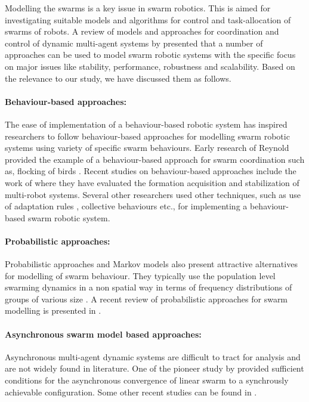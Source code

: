 Modelling the swarms is a key issue in swarm robotics. This is aimed for investigating suitable models and algorithms for control and task-allocation of swarms of robots. A review of models and approaches for coordination and control of dynamic multi-agent systems by \cite{Gazi+2006} presented that a number of approaches can be used to model swarm robotic systems with the specific focus on major issues like stability, performance, robustness and scalability. Based on the relevance to our study, we have discussed them as follows.
\paragraph*{Behaviour-based approaches:}
The ease of implementation of a behaviour-based robotic system has inspired researchers to follow behaviour-based approaches for modelling swarm robotic systems using variety of specific swarm behaviours. Early research of Reynold provided the example of a behaviour-based approach for swarm coordination such as, flocking of birds \cite{Reynolds1987}. Recent studies on behaviour-based approaches include the work of \cite{Balch+1998} where they have evaluated the formation acquisition and stabilization of multi-robot systems. Several other researchers used other techniques, such as use of adaptation rules \cite{Liu+2007}, collective behaviours \cite{Cianci2007} etc., for implementing a behaviour-based swarm robotic system.
\paragraph*{Probabilistic approaches:}
Probabilistic approaches and Markov models also present attractive alternatives for modelling of swarm behaviour. They typically use the population level swarming dynamics in a non spatial way in terms of frequency distributions of groups of various size \cite{Gazi+2006}. A recent review of probabilistic approaches for swarm modelling is presented in \cite{Lerman+2005}.
\paragraph*{Asynchronous swarm model based approaches:}
Asynchronous multi-agent dynamic systems are difficult to tract for analysis and are not widely found in literature. One of the pioneer study by \cite{Beni+1996} provided sufficient conditions for the asynchronous convergence of linear swarm to a synchrously achievable configuration. Some other recent studies can be found in \cite{Gazi+2006}.
